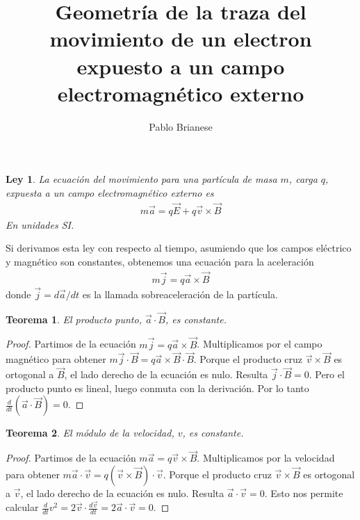\documentclass{article}
\title{Geometría de la traza del movimiento de un electron expuesto a un campo electromagnético externo}
\author{Pablo Brianese}
\newtheorem{physicalLaw}{Ley}
\newtheorem{theorem}{Teorema}
\begin{document}
  \maketitle
  \begin{physicalLaw}
    La ecuación del movimiento para una partícula de masa \(m\), carga \(q\), expuesta a un campo electromagnético externo es
    \begin{align}
      \label{equation:movementOfChargedParticleExposedToElectromagneticField}
      m \vec{a}
      =
      q \vec{E} + q \vec{v} \times \vec{B}
    \end{align}
    En unidades SI.
  \end{physicalLaw}

  Si derivamos esta ley con respecto al tiempo, asumiendo que los campos eléctrico y magnético son constantes, obtenemos una ecuación para la aceleración
  \begin{align}
    \label{equation:accelerationOfChargedParticleExposedToElectromagneticField}
    m \vec{j} = q \vec{a} \times \vec{B}
  \end{align}
  donde \(\vec{j} = d \vec{a} / d t\) es la llamada sobreaceleración de la partícula.

  \begin{theorem}
    \label{theorem:acceleration_dot_magneticFieldIsConstant}
    El producto punto, \(\vec{a} \cdot \vec{B}\), es constante.
  \end{theorem}
  \begin{proof}
    Partimos de la ecuación \(m \vec{j} = q \vec{a} \times \vec{B}\).
    Multiplicamos por el campo magnético para obtener \(m \vec{j} \cdot \vec{B} = q \vec{a} \times \vec{B} \cdot \vec{B}\).
    Porque el producto cruz \(\vec{v} \times \vec{B}\) es ortogonal a \(\vec{B}\), el lado derecho de la ecuación es nulo.
    Resulta \(\vec{j} \cdot \vec{B} = 0\).
    Pero el producto punto es lineal, luego conmuta con la derivación.
    Por lo tanto \(\frac{d}{d t} (\vec{a} \cdot \vec{B}) = 0\).
  \end{proof}

  \begin{theorem}
    \label{theorem:modulusOfVelocityIsConstant}
    El módulo de la velocidad, \(v\), es constante.
  \end{theorem}
  \begin{proof}
    Partimos de la ecuación \(m \vec{a} = q \vec{v} \times \vec{B}\).
    Multiplicamos por la velocidad para obtener \(m \vec{a} \cdot \vec{v} = q (\vec{v} \times \vec{B}) \cdot \vec{v}\).
    Porque el producto cruz \(\vec{v} \times \vec{B}\) es ortogonal a \(\vec{v}\), el lado derecho de la ecuación es nulo.
    Resulta \(\vec{a} \cdot \vec{v} = 0\).
    Esto nos permite calcular \(\frac{d}{d t} v^2 = 2 \vec{v} \cdot \frac{d \vec{v}}{d t} = 2 \vec{a} \cdot \vec{v} = 0\).
  \end{proof}
\end{document}
